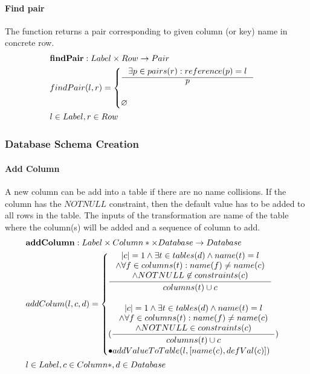 \documentclass[11pt]{article}
\begin{document}
\paragraph{Find pair} The function returns a pair corresponding to given column (or key) name in concrete row.
\begin{align*}
& \mathbf{findPair} : Label \times Row \rightarrow Pair \\
&	findPair(l, r) = \begin{cases}
		\inference{\exists p \in pairs(r) : reference(p) = l}{p} \\ \\
			\varnothing
		\end{cases}\\
&		l \in Label, r \in Row
\end{align*}
\subsubsection{Database Schema Creation}
\paragraph{Add Column} A new column can be add into a table if there are no name collisions. If the column has the $NOTNULL$ constraint, then the default value has to be added to all rows in the table. The inputs of the transformation are name of the table where the column(s) will be added and a sequence of column to add.
\begin{align*}
&	\mathbf{addColumn} : Label \times Column* \times Database \rightarrow Database \\ 	
&	addColum(l, c, d) = \begin{cases}
		\inference{|c| = 1 \wedge \exists t \in tables(d) \wedge name(t) = l \\ \wedge \forall f \in columns(t) : name(f) \neq name(c) \\ \wedge NOTNULL \not \in constraints(c) }{columns(t) \cup c}\\ \\
		(\inference{|c| = 1 \wedge \exists t \in tables(d) \wedge name(t) = l \\ \wedge \forall f \in columns(t) : name(f) \neq name(c) \\ \wedge NOTNULL \in constraints(c) }{columns(t) \cup c})\\ \bullet addValueToTable(l, [name(c), defVal(c)]) 
	 \end{cases}\\ 
&	 l \in Label, c \in Column*,d \in Database
\end{align*}
\end{document}
